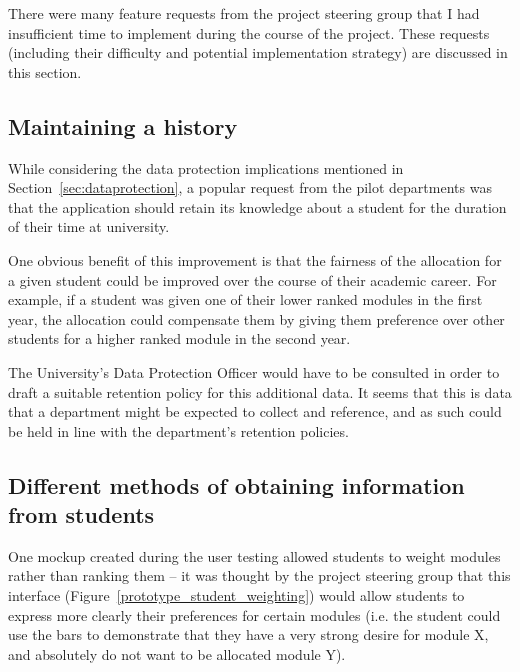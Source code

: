 \documentclass[draft]{scrartcl}
\begin{document}


There were many feature requests from the project steering group that I had
insufficient time to implement during the course of the project. These
requests (including their difficulty and potential implementation strategy)
are discussed in this section.

\subsection{Maintaining a history}

While considering the data protection implications mentioned in
Section~\ref{sec:dataprotection}, a popular request from the pilot departments
was that the application should retain its knowledge about a student for the
duration of their time at university.

One obvious benefit of this improvement is that the fairness of the allocation
for a given student could be improved over the course of their academic
career. For example, if a student was given one of their lower ranked modules
in the first year, the allocation could compensate them by giving them
preference over other students for a higher ranked module in the second
year.

The University's Data Protection Officer would have to be consulted in order
to draft a suitable retention policy for this additional data. It seems that
this is data that a department might be expected to collect and reference, and
as such could be held in line with the department's retention policies.

\subsection{Different methods of obtaining information from students}

One mockup created during the user testing allowed students to weight modules
rather than ranking them -- it was thought by the project steering group that
this interface (Figure~\ref{prototype_student_weighting}) would allow students
to express more clearly their preferences for certain modules (i.e. the
student could use the bars to demonstrate that they have a very strong desire
for module X, and absolutely do not want to be allocated module Y).
\end{document}
